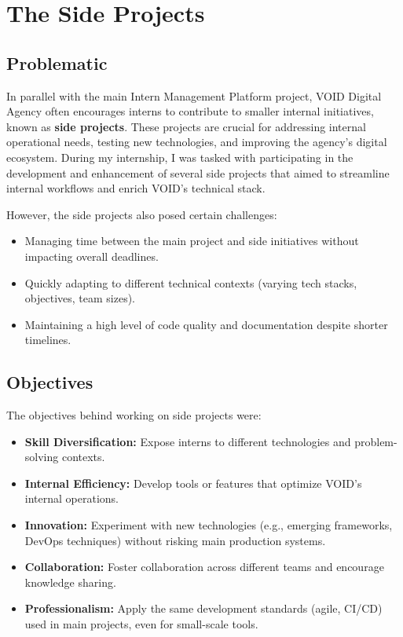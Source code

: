 \section{The Side Projects}

\subsection{Problematic}
\noindent
In parallel with the main Intern Management Platform project, VOID Digital Agency often encourages interns to contribute to smaller internal initiatives, known as \textbf{side projects}.  
These projects are crucial for addressing internal operational needs, testing new technologies, and improving the agency's digital ecosystem.  
During my internship, I was tasked with participating in the development and enhancement of several side projects that aimed to streamline internal workflows and enrich VOID's technical stack.

\medskip

\noindent
However, the side projects also posed certain challenges:
\begin{itemize}
\item Managing time between the main project and side initiatives without impacting overall deadlines.
\item Quickly adapting to different technical contexts (varying tech stacks, objectives, team sizes).
\item Maintaining a high level of code quality and documentation despite shorter timelines.
\end{itemize}

\subsection{Objectives}
\noindent
The objectives behind working on side projects were:

\begin{itemize}
\item \textbf{Skill Diversification:} Expose interns to different technologies and problem-solving contexts.
\item \textbf{Internal Efficiency:} Develop tools or features that optimize VOID's internal operations.
\item \textbf{Innovation:} Experiment with new technologies (e.g., emerging frameworks, DevOps techniques) without risking main production systems.
\item \textbf{Collaboration:} Foster collaboration across different teams and encourage knowledge sharing.
\item \textbf{Professionalism:} Apply the same development standards (agile, CI/CD) used in main projects, even for small-scale tools.
\end{itemize}

